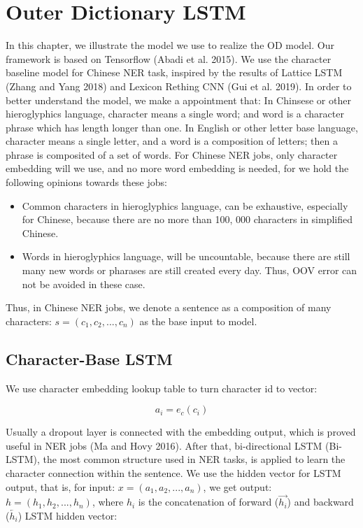 \documentclass[letterpaper]{article} %
\begin{document}
\section{Outer Dictionary LSTM}

In this chapter, we illustrate the model we use to realize the OD model. Our framework is based on Tensorflow (Abadi et al. 2015). We use the character baseline model for Chinese NER task,  inspired by the results of Lattice LSTM (Zhang and Yang 2018) and Lexicon Rething CNN (Gui et al. 2019). In order to better understand the model, we make a appointment that: In Chinsese or other hieroglyphics language, character means a single word; and word is a character phrase which has length longer than one. In English or other letter base language, character means a single letter, and a word is a composition of letters; then a phrase is composited of a set of words. For Chinese NER jobs, only character embedding will we use, and no more word embedding is needed, for we hold the following opinions towards these jobs:

\begin{itemize}
\item Common characters in hieroglyphics language, can be exhaustive,  especially for Chinese, because there are no more than 100, 000 characters in simplified Chinese. 
\item Words in hieroglyphics language, will be uncountable, because there are still many new words or pharases are still created every day. Thus, OOV error can not be avoided in these case.
\end{itemize}

Thus, in Chinese NER jobs, we denote a sentence as a composition of many characters: $s = (c_1, c_2, ..., c_n) $ as the base input to model.

\subsection{Character-Base LSTM}

We use character embedding lookup table to turn character id to vector:

\begin{equation}
a_i = e_c(c_i) \label{char_embedding}
\end{equation}

Usually a dropout layer is connected with the embedding output, which is proved useful in NER jobs (Ma and Hovy 2016). After that, bi-directional LSTM (Bi-LSTM), the most common structure used in NER tasks, is applied to learn the character connection within the sentence. We use the hidden vector for LSTM output, that is, for input: $x = (a_1, a_2, ..., a_n) $,  we get output: $h = (h_1, h_2, ..., h_n)$, where $h_i$ is the concatenation of forward ($\overrightarrow{h_i}$) and backward ($\overleftarrow{h_i}$) LSTM hidden vector:
\end{document}
